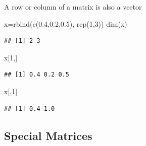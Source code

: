 \documentclass[
  ignorenonframetext,
]{beamer}
\newenvironment{Shaded}{\begin{snugshade}}{\end{snugshade}}
\newcommand{\DecValTok}[1]{\textcolor[rgb]{0.00,0.00,0.81}{#1}}
\newcommand{\FloatTok}[1]{\textcolor[rgb]{0.00,0.00,0.81}{#1}}
\newcommand{\FunctionTok}[1]{\textcolor[rgb]{0.00,0.00,0.00}{#1}}
\newcommand{\NormalTok}[1]{#1}
\newcommand{\OtherTok}[1]{\textcolor[rgb]{0.56,0.35,0.01}{#1}}
\begin{document}
\begin{frame}[fragile]{A row or column of a matrix is also a vector}
\protect\hypertarget{a-row-or-column-of-a-matrix-is-also-a-vector}{}
\begin{Shaded}
\begin{Highlighting}[]
\NormalTok{x}\OtherTok{=}\FunctionTok{rbind}\NormalTok{(}\FunctionTok{c}\NormalTok{(}\FloatTok{0.4}\NormalTok{,}\FloatTok{0.2}\NormalTok{,}\FloatTok{0.5}\NormalTok{), }\FunctionTok{rep}\NormalTok{(}\DecValTok{1}\NormalTok{,}\DecValTok{3}\NormalTok{))}
\FunctionTok{dim}\NormalTok{(x)}
\end{Highlighting}
\end{Shaded}

\begin{verbatim}
## [1] 2 3
\end{verbatim}

\begin{Shaded}
\begin{Highlighting}[]
\NormalTok{x[}\DecValTok{1}\NormalTok{,]}
\end{Highlighting}
\end{Shaded}

\begin{verbatim}
## [1] 0.4 0.2 0.5
\end{verbatim}

\begin{Shaded}
\begin{Highlighting}[]
\NormalTok{x[,}\DecValTok{1}\NormalTok{]}
\end{Highlighting}
\end{Shaded}

\begin{verbatim}
## [1] 0.4 1.0
\end{verbatim}
\end{frame}

\hypertarget{special-matrices}{%
\subsection{Special Matrices}\label{special-matrices}}
\end{document}
